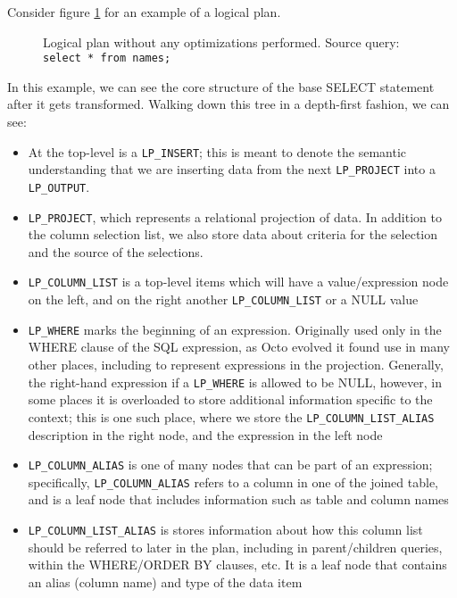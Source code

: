 \documentclass[]{article}
\def\code#1{\texttt{#1}}
\begin{document}
Consider figure \ref{fig:lp_before_optimizations} for an example of a logical plan.

\begin{figure}
	
	\caption{Logical plan without any optimizations performed. Source query: \texttt{select * from names;}}
	\label{fig:lp_before_optimizations}
\end{figure}

In this example, we can see the core structure of the base SELECT statement after it gets transformed.
Walking down this tree in a depth-first fashion, we can see:

\begin{itemize}
	\item At the top-level is a \code{LP\_INSERT}; this is meant to denote the semantic understanding that we are inserting data from the next \code{LP\_PROJECT} into a \code{LP\_OUTPUT}.
	\item \code{LP\_PROJECT}, which represents a relational projection of data. In addition to the column selection list, we also store data about criteria for the selection and the source of the selections.
	\item \code{LP\_COLUMN\_LIST} is a top-level items which will have a value/expression node on the left, and on the right another \code{LP\_COLUMN\_LIST} or a NULL value
	\item \code{LP\_WHERE} marks the beginning of an expression. Originally used only in the WHERE clause of the SQL expression, as Octo evolved it found use in many other places, including to represent expressions in the projection. Generally, the right-hand expression if a \code{LP\_WHERE} is allowed to be NULL, however, in some places it is overloaded to store additional information specific to the context; this is one such place, where we store the \code{LP\_COLUMN\_LIST\_ALIAS} description in the right node, and the expression in the left node
	\item \code{LP\_COLUMN\_ALIAS} is one of many nodes that can be part of an expression; specifically, \code{LP\_COLUMN\_ALIAS} refers to a column in one of the joined table, and is a leaf node that includes information such as table and column names
	\item \code{LP\_COLUMN\_LIST\_ALIAS} is stores information about how this column list should be referred to later in the plan, including in parent/children queries, within the WHERE/ORDER BY clauses, etc. It is a leaf node that contains an alias (column name) and type of the data item

\end{itemize}
\end{document}
